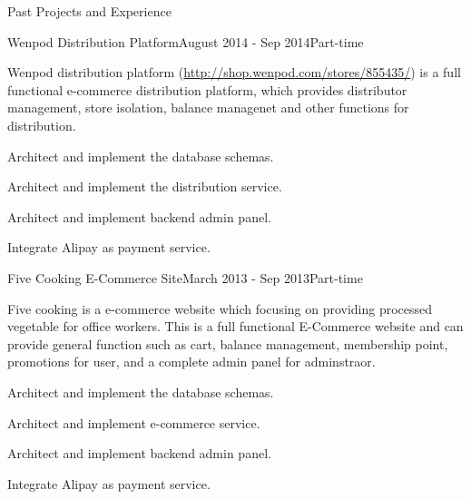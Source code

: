 \documentclass{resume} %
\newcommand{\http}{http:/\hspace{-0.3ex}/}
\begin{document}
\begin{rSection}{Past Projects and Experience}
\begin{rSubsection}{Wenpod Distribution Platform}{August 2014 - Sep 2014}{}{Part-time}

Wenpod distribution platform (\href{http://shop.wenpod.com/stores/855435/}{\http{}shop.wenpod.com/stores/855435/}) is a full functional e-commerce distribution platform, which provides distributor management, store isolation, balance managenet and other functions for distribution.

\begin{rSubsectionList}
\item Architect and implement the database schemas.
\item Architect and implement the distribution service.
\item Architect and implement backend admin panel.
\item Integrate Alipay as payment service.
\end{rSubsectionList}
\end{rSubsection}



\begin{rSubsection}{Five Cooking E-Commerce Site}{March 2013 - Sep 2013}{}{Part-time}

Five cooking is a e-commerce website which focusing on providing processed vegetable for office workers. This is a full functional E-Commerce website and can provide general function such as cart, balance management, membership point, promotions for user, and a complete admin panel for adminstraor.

\begin{rSubsectionList}
\item Architect and implement the database schemas.
\item Architect and implement e-commerce service.
\item Architect and implement backend admin panel.
\item Integrate Alipay as payment service.
\end{rSubsectionList}
\end{rSubsection}



\end{rSection}
\end{document}
